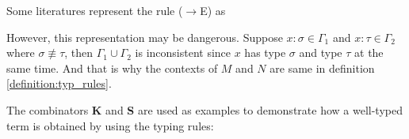 Some literatures represent the rule ($ \to $E) as
\begin{prooftree}
\end{prooftree}
However, this representation may be dangerous. Suppose $ x: \sigma \in \Gamma _1 $ and $ x: \tau \in \Gamma _2 $ where $ \sigma \not\equiv \tau $, then $ \Gamma _1 \cup \Gamma _2 $ is inconsistent since $ x $ has type $ \sigma $ and type $ \tau $ at the same time. And that is why the contexts of $ M $ and $ N $ are same in definition \ref{definition:typ_rules}.

The combinators  \textbf{K} and \textbf{S} are used as examples to demonstrate how a well-typed term is obtained by using the typing rules:
